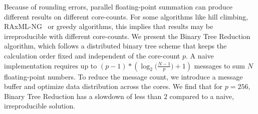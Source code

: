 
\Abstract
Because of rounding errors, parallel floating-point summation can produce different results on different core-counts.
For some algorithms like hill climbing, RAxML-NG~\cite{kozlov_raxml-ng_2019} or greedy algorithms, this implies that results may be irreproducible with different core-counts.
We present the Binary Tree Reduction algorithm, which follows a distributed binary tree scheme that keeps the calculation order fixed and independent of the core-count $p$.
A naive implementation requires up to $(p - 1) * (\log_2 \big(\frac{N-1}{p} \big) + 1)$ messages to sum $N$ floating-point numbers.
To reduce the message count, we introduce a message buffer and optimize data distribution across the cores.
We find that for $p=256$, Binary Tree Reduction has a slowdown of less than $2$ compared to a naive, irreproducible solution.